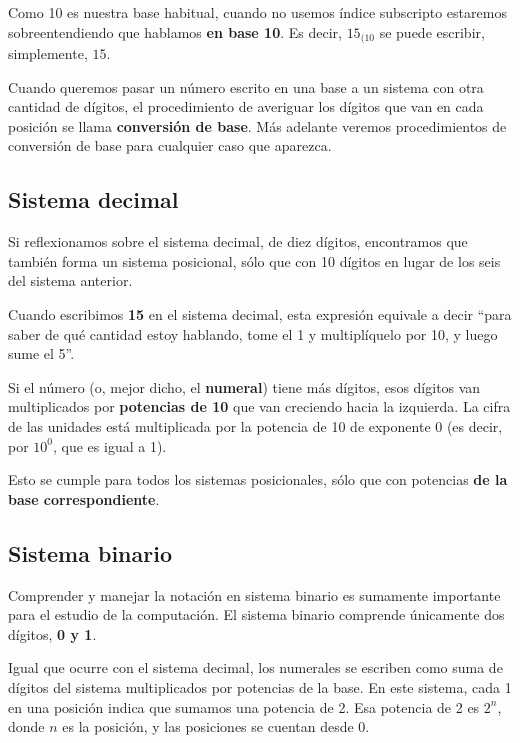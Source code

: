 \documentclass[spanish,a4paper,]{article}
\begin{document}
Como 10 es nuestra base habitual, cuando no usemos índice subscripto
estaremos sobreentendiendo que hablamos \textbf{en base 10}. Es decir,
\textbf{\(15_{(10}\)} se puede escribir, simplemente, \textbf{\(15\)}.

Cuando queremos pasar un número escrito en una base a un sistema con
otra cantidad de dígitos, el procedimiento de averiguar los dígitos que
van en cada posición se llama \textbf{conversión de base}. Más adelante
veremos procedimientos de conversión de base para cualquier caso que
aparezca.

\hypertarget{sistema-decimal}{%
\subsection{Sistema decimal}\label{sistema-decimal}}

Si reflexionamos sobre el sistema decimal, de diez dígitos, encontramos
que también forma un sistema posicional, sólo que con 10 dígitos en
lugar de los seis del sistema anterior.

Cuando escribimos \textbf{15} en el sistema decimal, esta expresión
equivale a decir ``para saber de qué cantidad estoy hablando, tome el 1
y multiplíquelo por 10, y luego sume el 5''.

Si el número (o, mejor dicho, el \textbf{numeral}) tiene más dígitos,
esos dígitos van multiplicados por \textbf{potencias de 10} que van
creciendo hacia la izquierda. La cifra de las unidades está multiplicada
por la potencia de 10 de exponente 0 (es decir, por \(10^0\), que es
igual a 1).

Esto se cumple para todos los sistemas posicionales, sólo que con
potencias \textbf{de la base correspondiente}.

\hypertarget{sistema-binario}{%
\subsection{Sistema binario}\label{sistema-binario}}

Comprender y manejar la notación en sistema binario es sumamente
importante para el estudio de la computación. El sistema binario
comprende únicamente dos dígitos, \textbf{0 y 1}.

Igual que ocurre con el sistema decimal, los numerales se escriben como
suma de dígitos del sistema multiplicados por potencias de la base. En
este sistema, cada 1 en una posición indica que sumamos una potencia de
2. Esa potencia de 2 es \(2^n\), donde \(n\) es la posición, y las
posiciones se cuentan desde 0.
\end{document}
